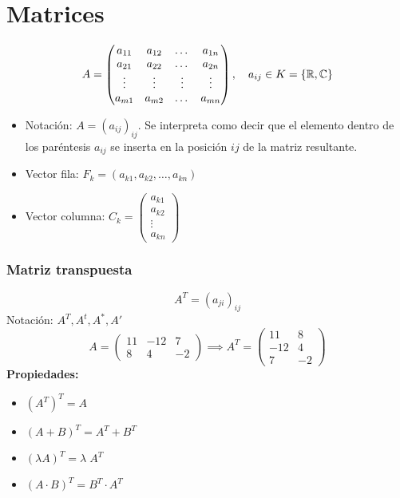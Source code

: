 
\section*{Matrices}
\[ A = 
\begin{pmatrix}
    a_{11} & a_{12} & \dots & a_{1n} \\
    a_{21} & a_{22} & \dots & a_{2n} \\
    \vdots & \vdots & \vdots & \vdots \\
    a_{m1} & a_{m2} & \dots & a_{mn} \\
\end{pmatrix}, \quad a_{ij} \in K = \{\mathbb{R},\mathbb{C}\}
\]
\begin{itemize}
    \item Notación: \(A = \left(a_{ij}\right)_{ij}\). Se interpreta como decir que el elemento dentro de los paréntesis \(a_{ij}\) se inserta en la posición \(ij\) de la matriz resultante.
    \item Vector fila: \(F_k = \left(a_{k1},a_{k2}, \dots, a_{kn}\right)\)
    \item Vector columna: \(C_k = \begin{pmatrix}
        a_{k1}\\a_{k2}\\\vdots\\a_{kn}
    \end{pmatrix}\)
\end{itemize}
\subsubsection*{Matriz transpuesta}
\[A^T = (a_{ji})_{ij}\]
Notación: \(A^T,A^t,A^*,A'\)
\[
    A = \begin{pmatrix}
        11 & -12 & 7 \\
        8 & 4 & -2
    \end{pmatrix} \implies A^T = \begin{pmatrix}
        11 & 8 \\
        -12 & 4\\
        7 & -2
    \end{pmatrix}\]
\textbf{Propiedades:}
\begin{itemize}
    \item \((A^T)^T = A\)
    \item \((A+B)^T = A^T + B^T\)
    \item \((\lambda A)^T =  \lambda \; A^T\)
    \item \((A \cdot B)^T = B^T \cdot A^T\)
\end{itemize}
 
